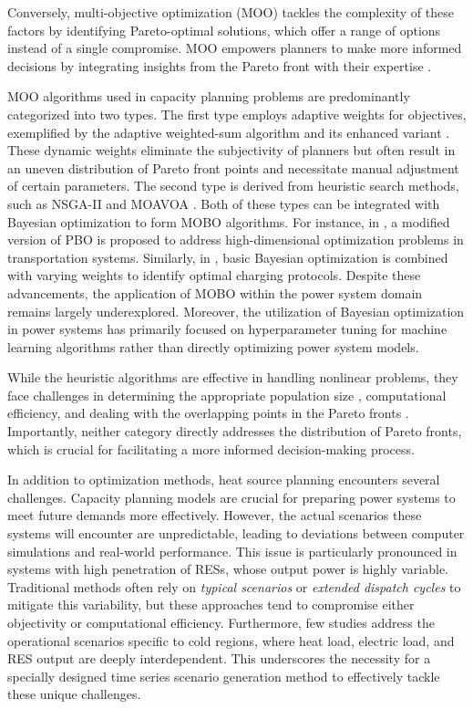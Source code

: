 Conversely, multi-objective optimization (MOO) tackles the complexity of these factors by identifying Pareto-optimal solutions, which offer a range of options instead of a single compromise. MOO empowers planners to make more informed decisions by integrating insights from the Pareto front with their expertise \cite{TIAN2024129612}.

MOO algorithms used in capacity planning problems are predominantly categorized into two types. The first type employs adaptive weights for objectives, exemplified by the adaptive weighted-sum algorithm \cite{AWS} and its enhanced variant \cite{EAWS}. These dynamic weights eliminate the subjectivity of planners but often result in an uneven distribution of Pareto front points and necessitate manual adjustment of certain parameters. The second type is derived from heuristic search methods, such as NSGA-II \cite{NSGAII} and MOAVOA \cite{MOAVOA}.
\textcolor{revise_blue}{
        Both of these types can be integrated with Bayesian optimization to form MOBO algorithms. For instance, in \cite{wang_high-dimensional_2024}, a modified version of PBO  \cite{PBO} is proposed to address high-dimensional optimization problems in transportation systems. Similarly, in  \cite{WANG2023233602}, basic Bayesian optimization is combined with varying weights to identify optimal charging protocols.
        Despite these advancements, the application of MOBO within the power system domain remains largely underexplored. Moreover, the utilization of Bayesian optimization in power systems has primarily focused on hyperparameter tuning for machine learning algorithms \cite{kianpoor_home_2024, jia_convopf-dop_2023, Ding_Bayesian} rather than directly optimizing power system models.
    }

While the heuristic algorithms are effective in handling nonlinear problems, they face challenges in determining the appropriate population size \cite{PBO}, computational efficiency, and dealing with the overlapping points in the Pareto fronts \cite{EAWS}. Importantly, neither category directly addresses the distribution of Pareto fronts, which is crucial for facilitating a more informed decision-making process.

In addition to optimization methods, heat source planning encounters several challenges. Capacity planning models are crucial for preparing power systems to meet future demands more effectively. However, the actual scenarios these systems will encounter are unpredictable, leading to deviations between computer simulations and real-world performance. This issue is particularly pronounced in systems with high penetration of RESs, whose output power is highly variable. Traditional methods often rely on \textit{typical scenarios} \cite{WANG2023121212} or \textit{extended dispatch cycles} \cite{9695353} to mitigate this variability, but these approaches tend to compromise either objectivity or computational efficiency. Furthermore, few studies address the operational scenarios specific to cold regions, where heat load, electric load, and RES output are deeply interdependent. This underscores the necessity for a specially designed time series scenario generation method to effectively tackle these unique challenges.

